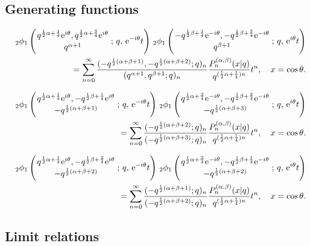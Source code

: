 \documentclass[envcountchap,graybox]{svmono}
\newcommand{\qhyp}[5]{\mbox{}_{#1}{\phi}_{#2}
\left(\genfrac{}{}{0pt}{}{#3}{#4}\,;\,q,\,#5\right)}
\newcommand{\e}{\textrm{e}}
\newcommand{\qhyp}[5]{\,\mbox{}_{#1}\phi_{#2}\!\left(
  \genfrac{}{}{0pt}{}{#3}{#4};#5\right)}
\begin{document}
\subsection*{Generating functions}
\begin{eqnarray}
\label{GenContqJacobi1}
& &\qhyp{2}{1}{q^{\frac{1}{2}\alpha+\frac{1}{4}}\e^{i\theta},
q^{\frac{1}{2}\alpha+\frac{3}{4}}\e^{i\theta}}{q^{\alpha+1}}{\e^{-i\theta}t}\,
\qhyp{2}{1}{-q^{\frac{1}{2}\beta+\frac{1}{4}}\e^{-i\theta},
-q^{\frac{1}{2}\beta+\frac{3}{4}}\e^{-i\theta}}{q^{\beta+1}}{\e^{i\theta}t}\nonumber\\
& &{}=\sum_{n=0}^{\infty}\frac{(-q^{\frac{1}{2}(\alpha+\beta+1)},-q^{\frac{1}{2}(\alpha+\beta+2)};q)_n}
{(q^{\alpha+1},q^{\beta+1};q)_n}\frac{P_n^{(\alpha,\beta)}(x|q)}{q^{(\frac{1}{2}\alpha+\frac{1}{4})n}}t^n,
\quad x=\cos\theta.
\end{eqnarray}

\begin{eqnarray}
\label{GenContqJacobi2}
& &\qhyp{2}{1}{q^{\frac{1}{2}\alpha+\frac{1}{4}}\e^{i\theta},
-q^{\frac{1}{2}\beta+\frac{1}{4}}\e^{i\theta}}{-q^{\frac{1}{2}(\alpha+\beta+1)}}{\e^{-i\theta}t}\,
\qhyp{2}{1}{q^{\frac{1}{2}\alpha+\frac{3}{4}}\e^{-i\theta},
-q^{\frac{1}{2}\beta+\frac{3}{4}}\e^{-i\theta}}{-q^{\frac{1}{2}(\alpha+\beta+3)}}{\e^{i\theta}t}\nonumber\\
& &{}=\sum_{n=0}^{\infty}\frac{(-q^{\frac{1}{2}(\alpha+\beta+2)};q)_n}
{(-q^{\frac{1}{2}(\alpha+\beta+3)};q)_n}\frac{P_n^{(\alpha,\beta)}(x|q)}{q^{(\frac{1}{2}\alpha+\frac{1}{4})n}}t^n,
\quad x=\cos\theta.
\end{eqnarray}

\begin{eqnarray}
\label{GenContqJacobi3}
& &\qhyp{2}{1}{q^{\frac{1}{2}\alpha+\frac{1}{4}}\e^{i\theta},
-q^{\frac{1}{2}\beta+\frac{3}{4}}\e^{i\theta}}{-q^{\frac{1}{2}(\alpha+\beta+2)}}{\e^{-i\theta}t}\,
\qhyp{2}{1}{q^{\frac{1}{2}\alpha+\frac{3}{4}}\e^{-i\theta},
-q^{\frac{1}{2}\beta+\frac{1}{4}}\e^{-i\theta}}{-q^{\frac{1}{2}(\alpha+\beta+2)}}{\e^{i\theta}t}\nonumber\\
& &{}=\sum_{n=0}^{\infty}\frac{(-q^{\frac{1}{2}(\alpha+\beta+1)};q)_n}
{(-q^{\frac{1}{2}(\alpha+\beta+2)};q)_n}\frac{P_n^{(\alpha,\beta)}(x|q)}{q^{(\frac{1}{2}\alpha+\frac{1}{4})n}}t^n,
\quad x=\cos\theta.
\end{eqnarray}

\subsection*{Limit relations}
\end{document}

